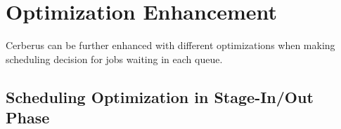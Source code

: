 % 


\section{Optimization Enhancement}

Cerberus can be further enhanced with different optimizations when making scheduling decision
for jobs waiting in each queue.

\subsection{Scheduling Optimization in Stage-In/Out Phase}

